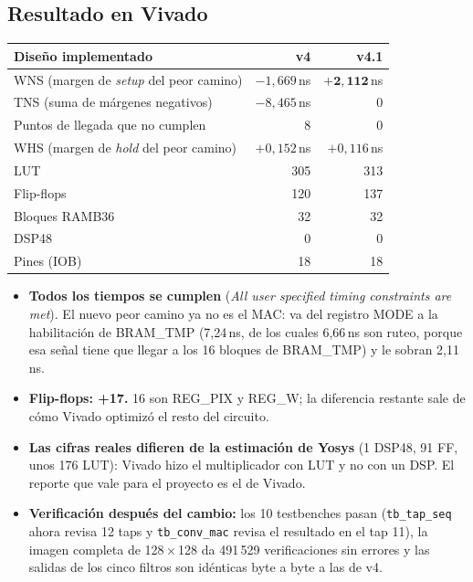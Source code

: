 \documentclass[11pt,a4paper]{article}
\begin{document}
\subsection{Resultado en Vivado}
\begin{center}
\small
\begin{tabular}{lrr}
\toprule
\textbf{Diseño implementado} & \textbf{v4} & \textbf{v4.1} \\
\midrule
WNS (margen de \emph{setup} del peor camino) & $-1{,}669$\,ns & $\mathbf{+2{,}112}$\,ns \\
TNS (suma de márgenes negativos) & $-8{,}465$\,ns & 0 \\
Puntos de llegada que no cumplen & 8 & 0 \\
WHS (margen de \emph{hold} del peor camino) & $+0{,}152$\,ns & $+0{,}116$\,ns \\
LUT & 305 & 313 \\
Flip-flops & 120 & 137 \\
Bloques RAMB36 & 32 & 32 \\
DSP48 & 0 & 0 \\
Pines (IOB) & 18 & 18 \\
\bottomrule
\end{tabular}
\end{center}
\begin{itemize}
\item \textbf{Todos los tiempos se cumplen} (\emph{All user specified timing constraints are met}). El nuevo peor camino ya no es el MAC: va del registro MODE a la habilitación de BRAM\_TMP (7,24\,ns, de los cuales 6,66\,ns son ruteo, porque esa señal tiene que llegar a los 16 bloques de BRAM\_TMP) y le sobran 2,11\,ns.
\item \textbf{Flip-flops: +17.} 16 son REG\_PIX y REG\_W; la diferencia restante sale de cómo Vivado optimizó el resto del circuito.
\item \textbf{Las cifras reales difieren de la estimación de Yosys} (1 DSP48, 91 FF, unos 176 LUT): Vivado hizo el multiplicador con LUT y no con un DSP. El reporte que vale para el proyecto es el de Vivado.
\item \textbf{Verificación después del cambio:} los 10 testbenches pasan (\texttt{tb\_tap\_seq} ahora revisa 12 taps y \texttt{tb\_conv\_mac} revisa el resultado en el tap 11), la imagen completa de 128\,×\,128 da 491\,529 verificaciones sin errores y las salidas de los cinco filtros son idénticas byte a byte a las de v4.
\end{itemize}
\end{document}
